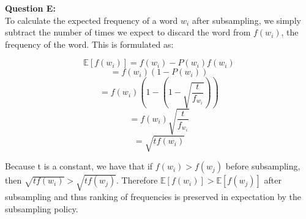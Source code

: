 \documentclass[12 pt]{article}
\begin{document}
	\noindent\textbf{Question E:} \\
	To calculate the expected frequency of a word $w_i$ after subsampling, we simply subtract the number of times we expect to discard the word from $f(w_i)$, the frequency of the word. This is formulated as:
	
	\[ \mathbb{E}[f(w_i)] = f(w_i) - P(w_i) f(w_i) \]
	\[                    = f(w_i) (1 - P(w_i))\]
	\[                       = f(w_i)(1 - (1 - \sqrt{\frac{t}{f_{w_i}}}))\]
	\[                        = f(w_i)\sqrt{\frac{t}{f_{w_i}}} \]
	\[ = \sqrt{tf(w_i)} \]
	
	\noindent Because t is a constant, we have that if $f(w_i) > f(w_j)$ before subsampling, then $\sqrt{tf(w_i)} > \sqrt{tf(w_j)}$. Therefore $\mathbb{E}[f(w_i)] > \mathbb{E}[f(w_j)]$ after subsampling and thus ranking of frequencies is preserved in expectation by the subsampling policy. 
	
	
\end{document}
